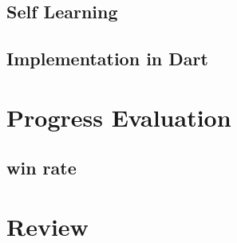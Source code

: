 \subsection{Self Learning}
\subsection{Implementation in Dart}

\section{Progress Evaluation}
\subsection{win rate}

\section{Review}